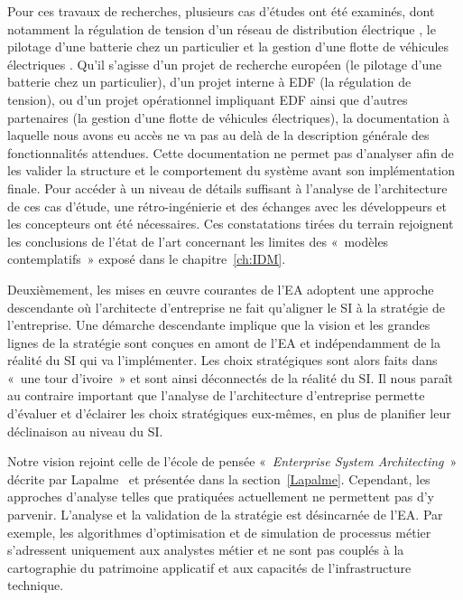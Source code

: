 Pour ces travaux de recherches, plusieurs cas d'études ont été examinés, dont
notamment la régulation de tension d'un réseau de distribution électrique
\cite{seghiri2014simulation}, le pilotage d'une batterie chez un particulier
\cite{seghiri2012animation} et la gestion d'une flotte de véhicules électriques
\cite{seghiri2015simulation}. Qu'il s'agisse d'un projet de recherche européen
(le pilotage d'une batterie chez un particulier), d'un projet interne à EDF (la
régulation de tension), ou d'un projet opérationnel impliquant EDF ainsi que
d'autres partenaires (la gestion d'une flotte de véhicules électriques), la
documentation à laquelle nous avons eu accès ne va pas au delà de la
description générale des fonctionnalités attendues. Cette documentation ne
permet pas d'analyser afin de les valider la structure et le comportement du
système avant son implémentation finale. Pour accéder à un niveau de détails
suffisant à l'analyse de l'architecture de ces cas d'étude, une
rétro-ingénierie et des échanges avec les développeurs et les concepteurs ont
été nécessaires. Ces constatations tirées du terrain rejoignent les conclusions
de l'état de l'art concernant les limites des «~modèles contemplatifs~» exposé
dans le chapitre~\ref{ch:IDM}.

Deuxièmement, les mises en œuvre courantes de l'EA adoptent une approche
descendante où l'architecte d'entreprise ne fait qu'aligner le SI à la
stratégie de l'entreprise. Une démarche descendante implique que la vision et
les grandes lignes de la stratégie sont conçues en amont de l'EA et
indépendamment de la réalité du SI qui va l'implémenter. Les choix stratégiques
sont alors faits dans «~une tour d'ivoire~» et sont ainsi déconnectés de la
réalité du SI. Il nous paraît au contraire important que l'analyse de
l'architecture d'entreprise permette d'évaluer et d'éclairer les choix
stratégiques eux-mêmes, en plus de planifier leur déclinaison au niveau du SI.

Notre vision rejoint celle de l'école de pensée «~\textit{Enterprise System
Architecting}~» décrite par Lapalme~\cite{lapalme2012three} et présentée dans
la section~\ref{Lapalme}. Cependant, les approches d'analyse telles que
pratiquées actuellement ne permettent pas d'y parvenir. L'analyse et la
validation de la stratégie est désincarnée de l'EA. Par exemple,
les algorithmes d'optimisation et de simulation de processus métier s'adressent
uniquement aux analystes métier et ne sont pas couplés à la cartographie du
patrimoine applicatif et aux capacités de l'infrastructure technique.

